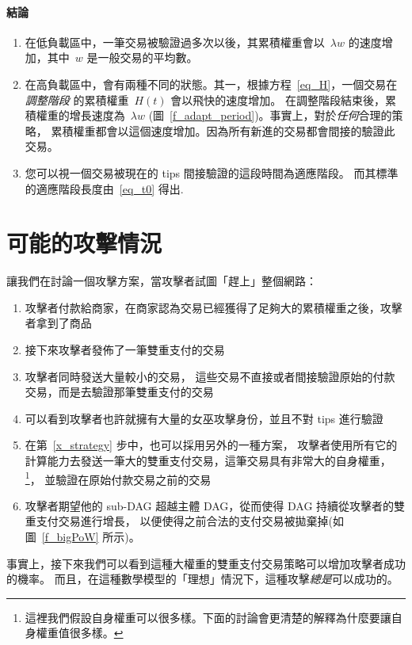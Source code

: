 \documentclass[12pt]{article}
\begin{document}
\begin{CJK}{UTF8}{bkai}
\goodbreak

\paragraph{結論}
\begin{enumerate}
 \item 在低負載區中，一筆交易被驗證過多次以後，其累積權重會以~$\lambda w$ 的速度增加，其中~$w$ 是一般交易的平均數。
 \item 在高負載區中，會有兩種不同的狀態。其一，根據方程~\eqref{eq_H}，一個交易在\emph{調整階段} 的累積權重~$H(t)$ 會以飛快的速度增加。
 在調整階段結束後，累積權重的增長速度為~$\lambda w$ (圖~\ref{f_adapt_period})。事實上，對於\emph{任何}合理的策略，
 累積權重都會以這個速度增加。因為所有新進的交易都會間接的驗證此交易。
 \item 您可以視一個交易被現在的 tips 間接驗證的這段時間為適應階段。
而其標準的適應階段長度由~\eqref{eq_t0} 得出.
\end{enumerate}


\section{可能的攻擊情況}
\label{s_attacks}
讓我們在討論一個攻擊方案，當攻擊者試圖「趕上」整個網路：
\begin{enumerate}
 \item 攻擊者付款給商家，在商家認為交易已經獲得了足夠大的累積權重之後，攻擊者拿到了商品
\item 接下來攻擊者發佈了一筆雙重支付的交易
\item \label{x_strategy} 攻擊者同時發送大量較小的交易，
這些交易不直接或者間接驗證原始的付款交易，而是去驗證那筆雙重支付的交易
\item 可以看到攻擊者也許就擁有大量的女巫攻擊身份，並且不對 tips 進行驗證
\item 在第~\ref{x_strategy} 步中，也可以採用另外的一種方案，
攻擊者使用所有它的計算能力去發送一筆大的雙重支付交易，這筆交易具有非常大的自身權重，
\footnote{這裡我們假設自身權重可以很多樣。下面的討論會更清楚的解釋為什麼要讓自身權重值很多樣。}，
並驗證在原始付款交易之前的交易
\item 攻擊者期望他的 sub-DAG 超越主體 DAG，從而使得 DAG 持續從攻擊者的雙重支付交易進行增長，
以便使得之前合法的支付交易被拋棄掉(如圖~\ref{f_bigPoW} 所示)。
\end{enumerate}
事實上，接下來我們可以看到這種大權重的雙重支付交易策略可以增加攻擊者成功的機率。
而且，在這種數學模型的「理想」情況下，這種攻擊\emph{總是}可以成功的。


\end{CJK}
\end{document}
